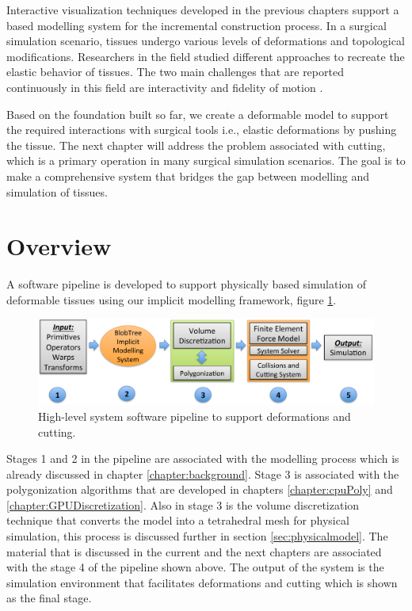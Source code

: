 \label{chapter:deformablemodel}
Interactive visualization techniques developed in the previous chapters support a \blob based modelling 
system for the incremental construction process. In a surgical simulation scenario, tissues undergo 
various levels of deformations and topological modifications. Researchers in the field studied different 
approaches to recreate the elastic behavior of tissues. The two main challenges that are reported 
continuously in this field are interactivity and fidelity of motion \cite{Meier2005}. 

Based on the foundation built so far, we create a deformable model to support the required interactions 
with surgical tools i.e., elastic deformations by pushing the tissue. 
The next chapter will address the problem associated with cutting, which is a primary operation in 
many surgical simulation scenarios. The goal is to make a comprehensive system that bridges the gap 
between modelling and simulation of tissues. 

\section{Overview}
A software pipeline is developed to support physically based simulation of deformable tissues using our 
implicit modelling framework, figure \ref{fig:systempipeline}. 

\begin{figure}[H]
  \centering
  \includegraphics[width=1.0\linewidth]{figures/deformable/pipeline.pdf}
  \caption{\label{fig:systempipeline}
  {High-level system software pipeline to support deformations and cutting. }
}
\end{figure}

Stages 1 and 2 in the pipeline are associated with the modelling process which is 
already discussed in chapter \ref{chapter:background}. Stage 3 is 
associated with the polygonization algorithms that are developed in chapters \ref{chapter:cpuPoly} 
and \ref{chapter:GPUDiscretization}. Also in stage 3 is the volume discretization technique that converts 
the \blob model into a tetrahedral mesh for physical simulation, this process is discussed further in 
section \ref{sec:physicalmodel}. The material that is discussed in the current and the next chapters are associated with the 
stage 4 of the pipeline shown above. The output of the system is the simulation environment that 
facilitates deformations and cutting which is shown as the final stage. 


